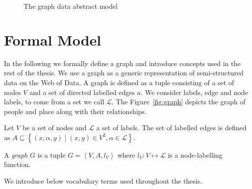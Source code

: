 \begin{figure}
	\centering
	\resizebox{.8\textwidth}{!}{
		
	}
	\caption{The graph data abstract model}
	\label{fig:gdm}
\end{figure}

\section{Formal Model}
\label{sec:gdm:formal-model}

In the following we formally define a graph and introduce concepts used in the rest of the thesis. We use a graph as a generic representation of semi-structured data on the Web of Data. A graph is defined as a tuple consisting of a set of nodes $V$ and a set of directed labelled edges $a$. We consider labels, edge and node labels, to come from a set we call $\mathcal{L}$. The Figure~\ref{fig:graph} depicts the graph of people and place along with their relationships.

\begin{definition}[Graph]
	Let $V$ be a set of nodes and $\mathcal{L}$ a set of labels. The set of labelled edges is defined as $A \subseteq \left\lbrace (x, \alpha, y) \mid (x, y) \in V^2, \alpha \in \mathcal{L} \right\rbrace$.
	
	A \emph{graph} $G$ is a tuple $G = \left\langle V, A, l_V \right\rangle$ where $l_V : V \mapsto \mathcal{L}$ is a node-labelling function.
\end{definition}

We introduce below vocabulary terms used throughout the thesis.

